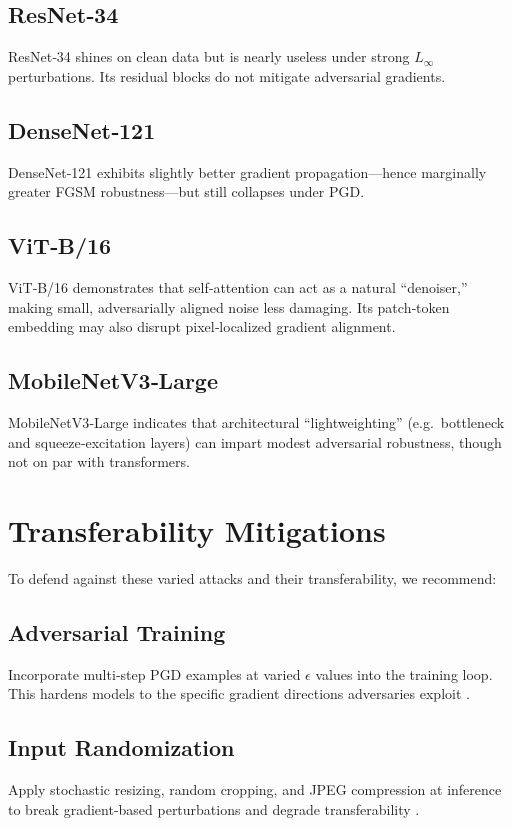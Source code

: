 \documentclass[twoside,11pt]{article}
\begin{document}
\subsection{ResNet‑34}
ResNet‑34 \citep{he2016deep} shines on clean data but is nearly useless under strong $L_\infty$ perturbations. Its residual blocks do not mitigate adversarial gradients.

\subsection{DenseNet‑121}
DenseNet‑121 \citep{huang2017densenet} exhibits slightly better gradient propagation—hence marginally greater FGSM robustness—but still collapses under PGD.

\subsection{ViT‑B/16}
ViT‑B/16  \citep{dosovitskiy2021vit} demonstrates that self‐attention can act as a natural “denoiser,” making small, adversarially aligned noise less damaging. Its patch‐token embedding may also disrupt pixel‐localized gradient alignment.

\subsection{MobileNetV3‑Large}
MobileNetV3‑Large \citep{howard2019searching} indicates that architectural “lightweighting” (e.g.\ bottleneck and squeeze‐excitation layers) can impart modest adversarial robustness, though not on par with transformers.

\section{Transferability Mitigations}

To defend against these varied attacks and their transferability, we recommend:

\subsection{Adversarial Training}
Incorporate multi‐step PGD examples at varied $\epsilon$ values into the training loop. This hardens models to the specific gradient directions adversaries exploit \citep{madry2018pgd}.

\subsection{Input Randomization}
Apply stochastic resizing, random cropping, and JPEG compression at inference to break gradient‐based perturbations and degrade transferability \citep{xie2019randomization}.
\end{document}
